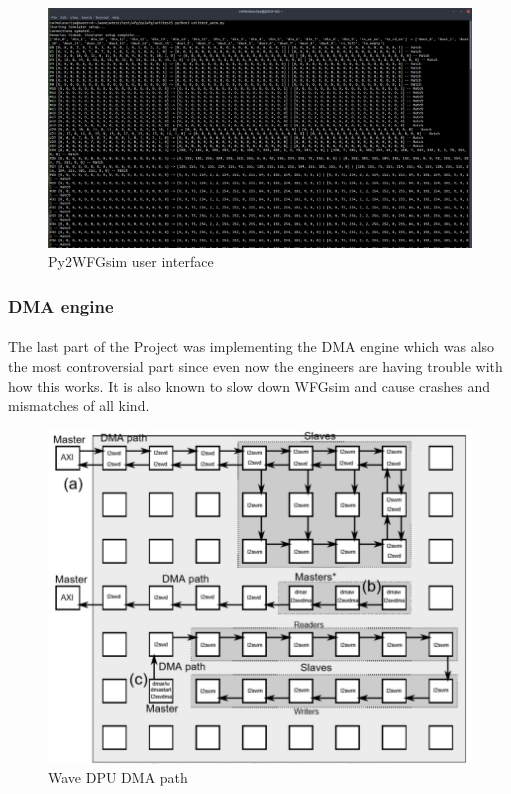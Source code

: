 \begin{figure}[h]
    \centering
    \includegraphics[trim=0cm 0cm 0cm 0cm, clip=true,scale=0.3]{figures/sim_result.png}
    \caption{Py2WFGsim user interface\label{Fig:simresult}}\vspace{-4mm}
    \end{figure}

\subsubsection{DMA engine}
\paragraph{}
The last part of the Project was implementing the DMA engine which was also the most controversial part since even now the engineers are having trouble with how this works. It is also known to slow down WFGsim and cause crashes and mismatches of all kind.

\begin{figure}[h]
    \centering
    \includegraphics[trim=0cm 0cm 0cm 0cm, clip=true,scale=0.5]{figures/dma_path.jpg}
    \caption{Wave DPU DMA path\label{Fig:dmapath}}\vspace{-4mm}
    \end{figure}

